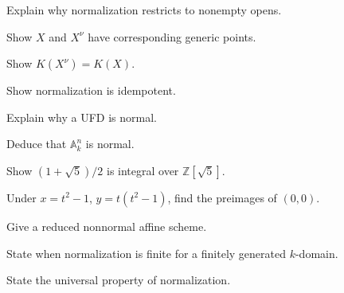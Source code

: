 \begin{exercise}\label{exer:vi28-12}
Explain why normalization restricts to nonempty opens.
\end{exercise}

\begin{exercise}\label{exer:vi28-13}
Show $X$ and $X^\nu$ have corresponding generic points.
\end{exercise}

\begin{exercise}\label{exer:vi28-14}
Show $K(X^\nu)=K(X)$.
\end{exercise}

\begin{exercise}[VI.28.E15: Idempotence]\label{exer:vi28-15}
Show normalization is idempotent.
\end{exercise}

\begin{exercise}[VI.28.E16: UFD]\label{exer:vi28-16}
Explain why a UFD is normal.
\end{exercise}

\begin{exercise}\label{exer:vi28-17}
Deduce that $\mathbb A^n_k$ is normal.
\end{exercise}

\begin{exercise}\label{exer:vi28-18}
Show $(1+\sqrt5)/2$ is integral over $\mathbb Z[\sqrt5]$.
\end{exercise}

\begin{exercise}\label{exer:vi28-19}
Under $x=t^2-1$, $y=t(t^2-1)$, find the preimages of $(0,0)$.
\end{exercise}

\begin{exercise}\label{exer:vi28-20}
Give a reduced nonnormal affine scheme.
\end{exercise}

\begin{exercise}\label{exer:vi28-21}
State when normalization is finite for a finitely generated $k$-domain.
\end{exercise}

\begin{exercise}\label{exer:vi28-22}
State the universal property of normalization.
\end{exercise}

